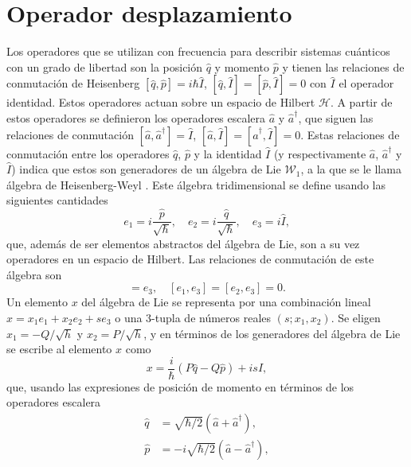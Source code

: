 \section{Operador desplazamiento}
Los operadores que se utilizan con frecuencia para describir sistemas cuánticos con un grado de libertad son la posición $\hat{q}$ y momento $\hat{p}$ y tienen las relaciones de conmutación de Heisenberg $[\hat{q}, \hat{p}] = i\hbar \hat{I}$, $[\hat{q}, \hat{I}] = [\hat{p}, \hat{I}]=0$ con $\hat{I}$ el operador identidad. Estos operadores actuan sobre un espacio de Hilbert $\mathcal{H}$. A partir de estos operadores se definieron los operadores escalera $\hat{a}$ y $\hat{a}^{\dagger}$, que siguen las relaciones de conmutación $[\hat{a}, \hat{a}^{\dagger}] = \hat{I}$, $[\hat{a}, \hat{I}]=[\hat{a}^{\dagger}, \hat{I}] = 0$. Estas relaciones de conmutación entre los operadores $\hat{q}$, $\hat{p}$ y la identidad $\hat{I}$ (y respectivamente $\hat{a}$, $\hat{a}^{\dagger}$ y $\hat{I}$) indica que estos son generadores de un álgebra de Lie $\mathcal{W}_1$, a la que se le llama álgebra de Heisenberg-Weyl \cite{Perelomov}. Este álgebra tridimensional se define usando las siguientes cantidades
\begin{equation}
  e_1 = i\frac{\hat{p}}{\sqrt{\hbar}}, \quad e_2 = i\frac{\hat{q}}{\sqrt{\hbar}}, \quad e_3 = i\hat{I},
\end{equation}
que, además de ser elementos abstractos del álgebra de Lie, son a su vez operadores en un espacio de Hilbert. Las relaciones de conmutación de este álgebra son
\begin{equation}
  [e_1, e_2] = e_3, \quad [e_1, e_3] = [e_2, e_3] = 0.
\end{equation}
Un elemento $x$ del álgebra de Lie se representa por una combinación lineal $x = x_1e_1 + x_2e_2 + s e_3$ o una 3-tupla de números reales $(s;x_1,x_2)$. Se eligen $x_1 = -Q/\sqrt{h}$ y $x_2 = P/\sqrt{h}$, y en términos de los generadores del álgebra de Lie se escribe al elemento $x$ como
\begin{equation}\label{eq:C3_combinacion_lineal}
  x = \frac{i}{\hbar}(P\hat{q} - Q\hat{p}) + is\hat{I},
\end{equation}
que, usando las expresiones de posición de momento en términos de los operadores escalera
\begin{align}
  \hat{q} & = \sqrt{\hbar/2}(\hat{a} + \hat{a}^{\dagger}) \label{eq:C3_op_posicion_esc},  \\
  \hat{p} & = -i\sqrt{\hbar/2}(\hat{a} - \hat{a}^{\dagger}) \label{eq:C3_op_momento_esc},
\end{align}
